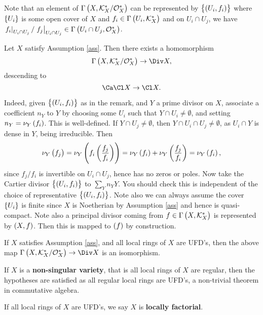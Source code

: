 \begin{remark*}
Note that an element of $ \Gamma\br{X, \KKK_X^* / \OOO_X^*} $ can be represented by $ \cbr{\br{U_i, f_i}} $ where $ \cbr{U_i} $ is some open cover of $ X $ and $ f_i \in \Gamma\br{U_i, \KKK_X^*} $ and on $ U_i \cap U_j $, we have $ \eval{f_i}_{U_i \cap U_j} / \eval{f_j}_{U_i \cap U_j} \in \Gamma\br{U_i \cap U_j, \OOO_X^*} $.
\end{remark*}

Let $ X $ satisfy Assumption \ref{ass}. Then there exists a homomorphism
$$ \Gamma\br{X, \KKK_X^* / \OOO_X^*} \to \Div X, $$
descending to
$$ \Ca\Cl X \to \Cl X. $$

\pagebreak

Indeed, given $ \cbr{\br{U_i, f_i}} $ as in the remark, and $ Y $ a prime divisor on $ X $, associate a coefficient $ n_Y $ to $ Y $ by choosing some $ U_i $ such that $ Y \cap U_i \ne \emptyset $, and setting $ n_Y = \nu_Y\br{f_i} $. This is well-defined. If $ Y \cap U_j \ne \emptyset $, then $ Y \cap U_i \cap U_j \ne \emptyset $, as $ U_i \cap Y $ is dense in $ Y $, being irreducible. Then
$$ \nu_Y\br{f_j} = \nu_Y\br{f_i\br{\dfrac{f_j}{f_i}}} = \nu_Y\br{f_i} + \nu_Y\br{\dfrac{f_j}{f_i}} = \nu_Y\br{f_i}, $$
since $ f_j / f_i $ is invertible on $ U_i \cap U_j $, hence has no zeros or poles. Now take the Cartier divisor $ \cbr{\br{U_i, f_i}} $ to $ \sum_Y n_YY $. You should check this is independent of the choice of representative $ \cbr{\br{U_i, f_i}} $. Note also we can always assume the cover $ \cbr{U_i} $ is finite since $ X $ is Noetherian by Assumption \ref{ass} and hence is quasi-compact. Note also a principal divisor coming from $ f \in \Gamma\br{X, \KKK_X^*} $ is represented by $ \br{X, f} $. Then this is mapped to $ \br{f} $ by construction.

\begin{proposition}
If $ X $ satisfies Assumption \ref{ass}, and all local rings of $ X $ are UFD's, then the above map $ \Gamma\br{X, \KKK_X^* / \OOO_X^*} \to \Div X $ is an isomorphism.
\end{proposition}

\begin{remark*}
If $ X $ is a \textbf{non-singular variety}, that is all local rings of $ X $ are regular, then the hypotheses are satisfied as all regular local rings are UFD's, a non-trivial theorem in commutative algebra.
\end{remark*}

\begin{definition*}
If all local rings of $ X $ are UFD's, we say $ X $ is \textbf{locally factorial}.
\end{definition*}

